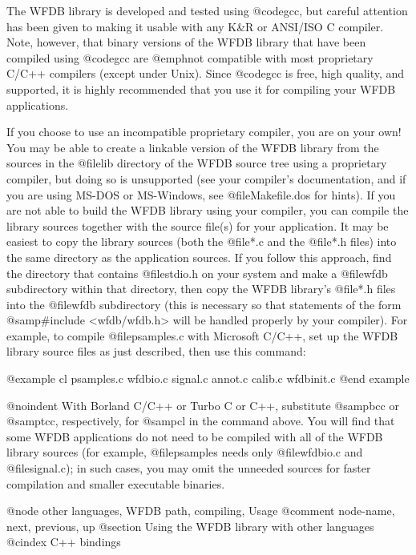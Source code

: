 {{The WFDB library is developed and tested using @code{gcc}, but careful
attention has been given to making it usable with any K&R or ANSI/ISO C
compiler.  Note, however, that binary versions of the WFDB library that
have been compiled using @code{gcc} are @emph{not} compatible with most
proprietary C/C++ compilers (except under Unix).  Since @code{gcc} is
free, high quality, and supported, it is highly recommended that you
use it for compiling your WFDB applications.

If you choose to use an incompatible proprietary compiler, you are on
your own!  You may be able to create a linkable version of the WFDB
library from the sources in the @file{lib} directory of the WFDB source
tree using a proprietary compiler, but doing so is unsupported (see your
compiler's documentation, and if you are using MS-DOS or MS-Windows, see
@file{Makefile.dos} for hints).  If you are not able to build the WFDB
library using your compiler, you can compile the library sources
together with the source file(s) for your application.  It may be
easiest to copy the library sources (both the @file{*.c} and the
@file{*.h} files) into the same directory as the application sources.
If you follow this approach, find the directory that contains @file{stdio.h}
on your system and make a @file{wfdb} subdirectory within that directory,
then copy the WFDB library's @file{*.h} files into the @file{wfdb}
subdirectory (this is necessary so that statements of the form
@samp{#include <wfdb/wfdb.h>} will be handled properly by your compiler).
For example, to compile @file{psamples.c} with Microsoft C/C++, set up
the WFDB library source files as just described, then use this command:

@example
cl psamples.c wfdbio.c signal.c annot.c calib.c wfdbinit.c
@end example

@noindent
With Borland C/C++ or Turbo C or C++, substitute @samp{bcc} or
@samp{tcc}, respectively, for @samp{cl} in the command above.  You will
find that some WFDB applications do not need to be compiled with all of
the WFDB library sources (for example, @file{psamples} needs only
@file{wfdbio.c} and @file{signal.c}); in such cases, you may omit the
unneeded sources for faster compilation and smaller executable binaries.


@node     other languages, WFDB path, compiling, Usage
@comment  node-name,  next,  previous,  up
@section Using the WFDB library with other languages
@cindex C++ bindings

}}
